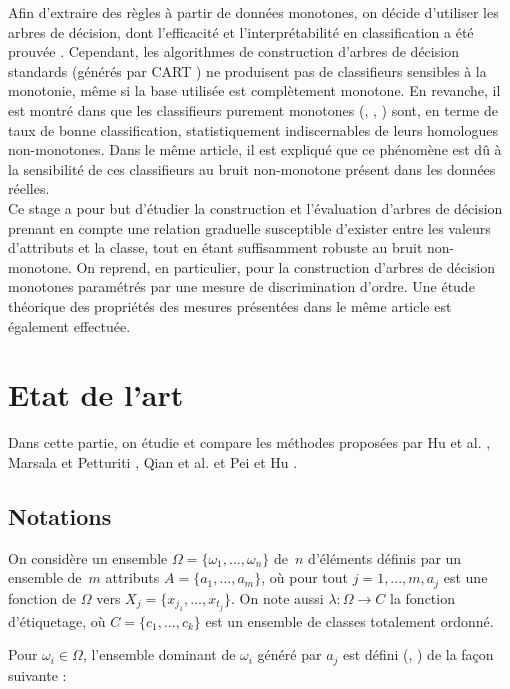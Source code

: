 \documentclass[a4paper]{article}
\begin{document}
Afin d'extraire des règles à partir de données monotones, on décide d'utiliser
les arbres de décision, dont l'efficacité et l'interprétabilité en
classification a été prouvée \cite{quinlan-induction}.  Cependant, les
algorithmes de construction d'arbres de décision standards (générés par CART
\cite{leo-classification}) ne produisent pas de classifieurs sensibles à la
monotonie, même si la base utilisée est complètement monotone.  En revanche, il
est montré dans \cite{ben-adding} que les classifieurs purement monotones
(\cite{ben-learning}, \cite{ben-monotonicity}, \cite{cao-consistent}) sont, en
terme de taux de bonne classification, statistiquement indiscernables de leurs
homologues non-monotones.  Dans le même article, il est expliqué que ce
phénomène est dû à la sensibilité de ces classifieurs au bruit non-monotone
présent dans les données réelles. \\

Ce stage a pour but d'étudier la construction et l'évaluation d'arbres de
décision prenant en compte une relation graduelle susceptible d'exister entre
les valeurs d'attributs et la classe, tout en étant suffisamment robuste au
bruit non-monotone. On reprend, en particulier, \cite{marsala-rank} pour la
construction d'arbres de décision monotones paramétrés par une mesure de
discrimination d'ordre. Une étude théorique des propriétés des mesures présentées
dans le même article est également effectuée.\\

\section{Etat de l'art} 
Dans cette partie, on étudie et compare les méthodes proposées par Hu et al.
\cite{hu-rank}, Marsala et Petturiti \cite{marsala-rank}, Qian et al.
\cite{qian-fusing} et Pei et Hu \cite{pei-partially}.

\subsection{Notations}
On considère un ensemble $\Omega = \{\omega_1,...,\omega_n\}$ de~$n$ d'éléments définis
par un ensemble de~$m$ attributs $A = \{a_1,...,a_m\}$, où pour tout $j=1,...,m, a_j$
est une fonction de $\Omega$ vers $X_j = \{x_{j_1},...,x_{t_j}\}$. On note aussi
$\lambda: \Omega \rightarrow C$ la fonction d'étiquetage, où $C =
\{c_1,...,c_k\}$ est un ensemble de classes totalement ordonné.

Pour $\omega_i \in \Omega$, l'ensemble dominant de $\omega_i$ généré par $a_j$
est défini (\cite{greco-roughappr}, \cite{greco-roughsets}) de la façon suivante :
\end{document}
